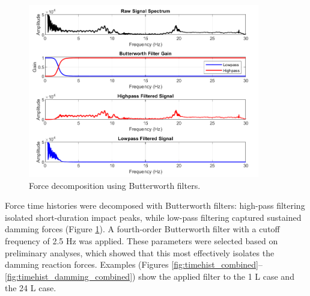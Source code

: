\documentclass{article}
\begin{document}
{\begin{figure}[htbp] \centering \includegraphics[width=0.9\textwidth]{high_low_pass.png} \caption{Force decomposition using Butterworth filters.} \label{fig:high_low_pass} \end{figure}

Force time histories were decomposed with Butterworth filters: high-pass filtering isolated short-duration impact peaks, while low-pass filtering captured sustained damming forces (Figure \ref{fig:high_low_pass}). A fourth-order Butterworth filter with a cutoff frequency of 2.5 Hz was applied. These parameters were selected based on preliminary analyses, which showed that this most effectively isolates the damming reaction forces. Examples (Figures \ref{fig:timehist_combined}–\ref{fig:timehist_damming_combined}) show the applied filter to the 1 L case and the 24 L case. 

}
\end{document}
